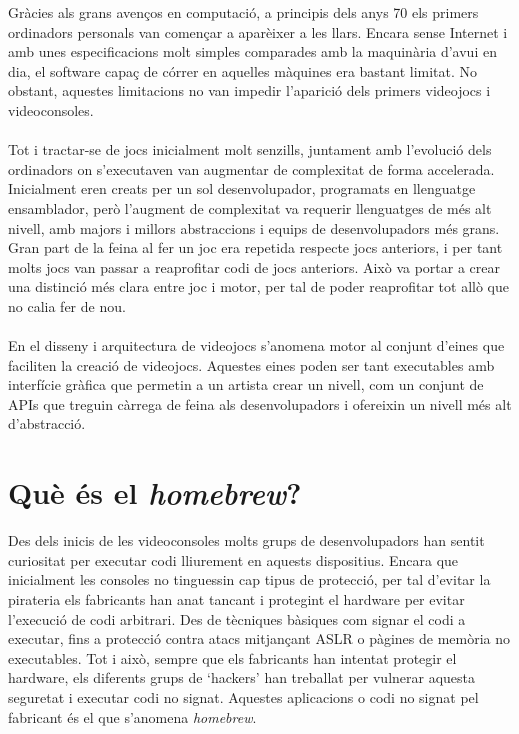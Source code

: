 Gràcies als grans avenços en computació, a principis dels anys 70 els primers ordinadors personals van començar a aparèixer a les llars.
Encara sense Internet i amb unes especificacions molt simples comparades amb la maquinària d'avui en dia, el software capaç de córrer en aquelles màquines era bastant limitat.
No obstant, aquestes limitacions no van impedir l'aparició dels primers videojocs i videoconsoles. 
\paragraph{}
Tot i tractar-se de jocs inicialment molt senzills, juntament amb l'evolució dels ordinadors on s'executaven van augmentar de complexitat de forma accelerada. Inicialment eren creats per un sol desenvolupador, programats en llenguatge ensamblador, però l'augment de complexitat va requerir llenguatges de més alt nivell, amb majors i millors abstraccions i equips de desenvolupadors més grans.
Gran part de la feina al fer un joc era repetida respecte jocs anteriors, i per tant molts jocs van passar a reaprofitar codi de jocs anteriors. Això va portar a crear una distinció més clara entre joc i motor, per tal de poder reaprofitar tot allò que no calia fer de nou.

\paragraph{}
En el disseny i arquitectura de videojocs s'anomena motor al conjunt d'eines que faciliten la creació de videojocs.
Aquestes eines poden ser tant executables amb interfície gràfica que permetin a un artista crear un nivell, com un conjunt de APIs que treguin càrrega de feina als desenvolupadors i ofereixin un nivell més alt d'abstracció.

\section{Què és el \textit{homebrew}?}
Des dels inicis de les videoconsoles molts grups de desenvolupadors han sentit curiositat per executar codi lliurement en aquests dispositius.
Encara que inicialment les consoles no tinguessin cap tipus de protecció, per tal d'evitar la pirateria els fabricants han anat tancant i protegint el hardware per evitar l'execució de codi arbitrari.
Des de tècniques bàsiques com signar el codi a executar, fins a protecció contra atacs mitjançant ASLR o pàgines de memòria no executables.
Tot i això, sempre que els fabricants han intentat protegir el hardware, els diferents grups de `hackers' han treballat per vulnerar aquesta seguretat i executar codi no signat.
Aquestes aplicacions o codi no signat pel fabricant és el que s'anomena \textit{homebrew}.

